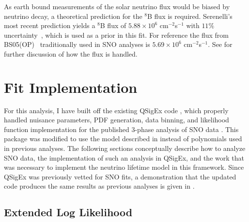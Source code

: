 As earth bound measurements of the solar neutrino flux would be biased by neutrino decay, a theoretical prediction for the $^8$B flux is required.
Serenelli's most recent prediction yields a $^8$B flux of $5.88\times10^{6}$ cm$^{-2}$s$^{-1}$ with $11\%$ uncertainty~\cite{serenelli}, which is used as a prior in this fit.
For reference the flux from BS05(OP)~\cite{bs05op} traditionally used in SNO analyses is $5.69\times10^6$ cm$^{-2}$s$^{-1}$.
See  for further discussion of how the flux is handled.

\section{Fit Implementation}
\label{fit_impl}

For this analysis, I have built off the existing QSigEx code \cite{plthesis}, which properly handled nuisance parameters, PDF generation, data binning, and likelihood function implementation for the published 3-phase analysis of SNO data \cite{3phase}.
This package was modified to use the model described in  instead of polynomials used in previous analyses.
The following sections conceptually describe how to analyze SNO data, the implementation of such an analysis in QSigEx, and the work that was necessary to implement the neutrino lifetime model in this framework.
Since QSigEx was previously vetted for SNO fits, a demonstration that the updated code produces the same results as previous analyses is given in .

\subsection{Extended Log Likelihood}


